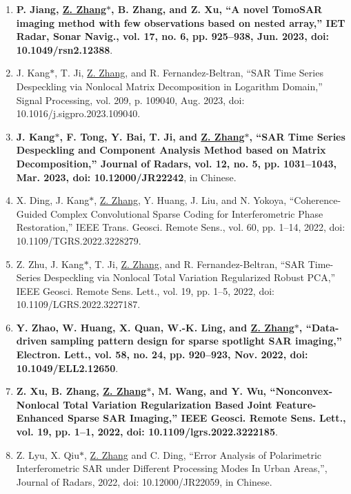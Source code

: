 \documentclass[paper=a4,fontsize=11pt]{scrartcl}
\begin{document}
\begin{enumerate}
\item \textbf{P. Jiang, \underline{Z. Zhang$\ast$}, B. Zhang, and Z. Xu, ``A novel TomoSAR imaging method with few observations based on nested array,'' IET Radar, Sonar Navig., vol. 17, no. 6, pp. 925–938, Jun. 2023, doi: 10.1049/rsn2.12388}.

\item J. Kang$\ast$, T. Ji, \underline{Z. Zhang}, and R. Fernandez-Beltran, ``SAR Time Series Despeckling via Nonlocal Matrix Decomposition in Logarithm Domain,'' Signal Processing, vol. 209, p. 109040, Aug. 2023, doi: 10.1016/j.sigpro.2023.109040.

\item \textbf{J. Kang$\ast$, F. Tong, Y. Bai, T. Ji, and \underline{Z. Zhang$\ast$}, ``SAR Time Series Despeckling and Component Analysis Method based on Matrix Decomposition,'' Journal of Radars, vol. 12, no. 5, pp. 1031–1043, Mar. 2023, doi: 10.12000/JR22242}, in Chinese.

\item X. Ding, J. Kang$\ast$, \underline{Z. Zhang}, Y. Huang, J. Liu, and N. Yokoya, ``Coherence-Guided Complex Convolutional Sparse Coding for Interferometric Phase Restoration,'' IEEE Trans. Geosci. Remote Sens., vol. 60, pp. 1–14, 2022, doi: 10.1109/TGRS.2022.3228279.

\item Z. Zhu, J. Kang$\ast$, T. Ji, \underline{Z. Zhang}, and R. Fernandez-Beltran, ``SAR Time-Series Despeckling via Nonlocal Total Variation Regularized Robust PCA,'' IEEE Geosci. Remote Sens. Lett., vol. 19, pp. 1–5, 2022, doi: 10.1109/LGRS.2022.3227187.​

\item \textbf{Y. Zhao, W. Huang, X. Quan, W.-K. Ling, and \underline{Z. Zhang$\ast$}, ``Data-driven sampling pattern design for sparse spotlight SAR imaging,'' Electron. Lett., vol. 58, no. 24, pp. 920–923, Nov. 2022, doi: 10.1049/ELL2.12650}.

\item \textbf{Z. Xu, B. Zhang, \underline{Z. Zhang$\ast$}, M. Wang, and Y. Wu, ``Nonconvex-Nonlocal Total Variation Regularization Based Joint Feature-Enhanced Sparse SAR Imaging,'' IEEE Geosci. Remote Sens. Lett., vol. 19, pp. 1–1, 2022, doi: 10.1109/lgrs.2022.3222185}.

\item Z. Lyu, X. Qiu$\ast$, \underline{Z. Zhang} and C. Ding, ``Error Analysis of Polarimetric Interferometric SAR under Different Processing Modes In Urban Areas,'', Journal of Radars, 2022, doi: 10.12000/JR22059, in Chinese.


\end{enumerate}
\end{document}
